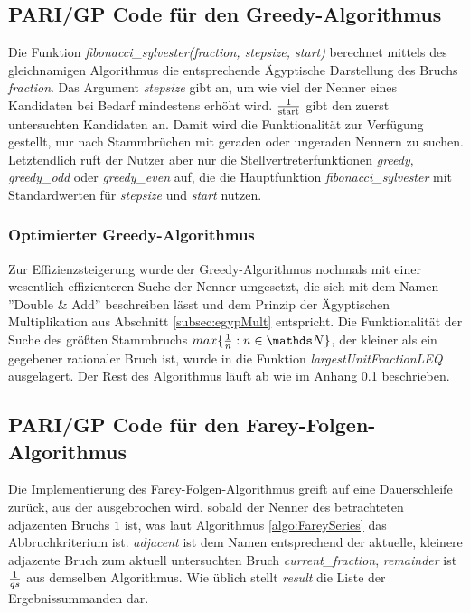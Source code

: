 \subsection{PARI/GP Code für den Greedy-Algorithmus}\label{code:greedy}
Die Funktion \emph{fibonacci\_sylvester(fraction, stepsize, start)} berechnet mittels des gleichnamigen Algorithmus die entsprechende Ägyptische Darstellung des Bruchs \emph{fraction}. Das Argument \emph{stepsize} gibt an, um wie viel der Nenner eines Kandidaten bei Bedarf mindestens erhöht wird. $\frac{1}{\text{start}}$ gibt den zuerst untersuchten Kandidaten an. Damit wird die Funktionalität zur Verfügung gestellt, \bspw nur nach Stammbrüchen mit geraden oder ungeraden Nennern zu suchen.\\
Letztendlich ruft der Nutzer aber nur die Stellvertreterfunktionen \emph{greedy}, \emph{greedy\_odd} oder \emph{greedy\_even} auf, die die Hauptfunktion \emph{fibonacci\_sylvester} mit Standardwerten für \emph{stepsize} und \emph{start} nutzen.



\subsubsection{Optimierter Greedy-Algorithmus}\label{code:greedy_fast}
Zur Effizienzsteigerung wurde der Greedy-Algorithmus nochmals mit einer wesentlich effizienteren Suche der Nenner umgesetzt, die sich mit dem Namen ''Double \& Add'' beschreiben lässt und dem Prinzip der Ägyptischen Multiplikation aus Abschnitt \ref{subsec:egypMult} entspricht. Die Funktionalität der Suche des größten Stammbruchs $max\{\uf{n}: n \in \N\}$, der kleiner als ein gegebener rationaler Bruch ist, wurde in die Funktion \emph{largestUnitFractionLEQ} ausgelagert. Der Rest des Algorithmus läuft ab wie im Anhang \ref{code:greedy} beschrieben.



\subsection{PARI/GP Code für den Farey-Folgen-Algorithmus}\label{code:fareyseries}
Die Implementierung des Farey-Folgen-Algorithmus greift auf eine Dauerschleife zurück, aus der ausgebrochen wird, sobald der Nenner des betrachteten adjazenten Bruchs $1$ ist, was laut Algorithmus \ref{algo:FareySeries} das Abbruchkriterium ist. \emph{adjacent} ist dem Namen entsprechend der aktuelle, kleinere adjazente Bruch zum aktuell untersuchten Bruch \emph{current\_fraction}, \emph{remainder} ist $\frac{1}{qs}$ aus demselben Algorithmus. Wie üblich stellt \emph{result} die Liste der Ergebnissummanden dar.


